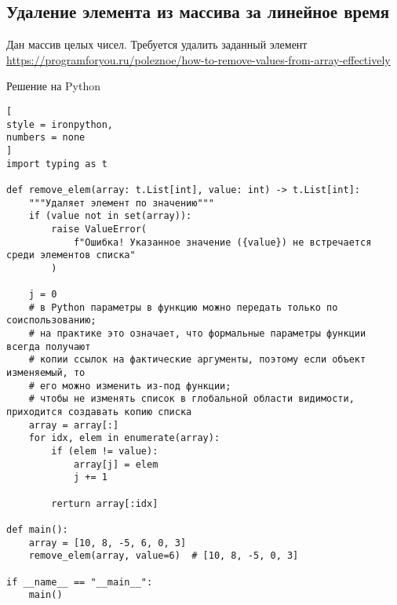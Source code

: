 \documentclass[%
	11pt,
	a4paper,
	utf8,
		]{article}
\begin{document}
\subsection{Удаление элемента из массива за линейное время}

Дан массив целых чисел. Требуется удалить заданный элемент \url{https://programforyou.ru/poleznoe/how-to-remove-values-from-array-effectively}

Решение на Python
\begin{lstlisting}[
style = ironpython,
numbers = none
]
import typing as t

def remove_elem(array: t.List[int], value: int) -> t.List[int]:
    """Удаляет элемент по значению"""
    if (value not in set(array)):
        raise ValueError(
            f"Ошибка! Указанное значение ({value}) не встречается среди элементов списка"
        )
        
    j = 0
    # в Python параметры в функцию можно передать только по соиспользованию;
    # на практике это означает, что формальные параметры функции всегда получают
    # копии ссылок на фактические аргументы, поэтому если объект изменяемый, то
    # его можно изменить из-под функции;
    # чтобы не изменять список в глобальной области видимости, приходится создавать копию списка
    array = array[:]  
    for idx, elem in enumerate(array):
        if (elem != value):
            array[j] = elem
            j += 1
        
        rerturn array[:idx]
        
def main():
    array = [10, 8, -5, 6, 0, 3]
    remove_elem(array, value=6)  # [10, 8, -5, 0, 3]
    
if __name__ == "__main__":
    main()
\end{lstlisting}




\begin{thebibliography}{99}
\end{thebibliography}


\lstlistoflistings{}
\end{document}
